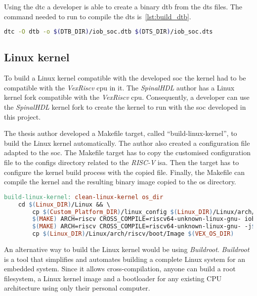 Using the \acrfull{dtc} a developer is able to create a binary \acrfull{dtb} from the \acrfull{dts} files. The command needed to run to compile the \acrshort{dts} is~\ref{lst:build_dtb}.

\begin{lstlisting}[language=bash, caption={Makefile target to build the device tree blob.}, label=lst:build_dtb]
dtc -O dtb -o $(DTB_DIR)/iob_soc.dtb $(DTS_DIR)/iob_soc.dts
\end{lstlisting}

\subsection{Linux kernel}
To build a Linux kernel compatible with the developed \acrshort{soc} the kernel had to be compatible with the \textit{VexRiscv} \acrshort{cpu} in it. The \textit{SpinalHDL} author has a Linux kernel fork compatible with the \textit{VexRiscv} \acrshort{cpu}. Consequently, a developer can use the \textit{SpinalHDL} kernel fork to create the kernel to run with the \acrshort{soc} developed in this project.

The thesis author developed a Makefile target, called \enquote{build-linux-kernel}, to build the Linux kernel automatically. The author also created a configuration file adapted to the \acrshort{soc}. The Makefile target has to copy the customised configuration file to the configs directory related to the \textit{RISC-V} \acrshort{isa}. Then the target has to configure the kernel build process with the copied file. Finally, the Makefile can compile the kernel and the resulting binary image copied to the \acrshort{os} directory.

\begin{lstlisting}[language=make, caption={Root file system Makefile target.}, label=lst:rootfs_makefile]
build-linux-kernel: clean-linux-kernel os_dir
    cd $(Linux_DIR)/Linux && \
        cp $(Custom_Platform_DIR)/linux_config $(Linux_DIR)/Linux/arch/riscv/configs/iob_soc_defconfig && \
        $(MAKE) ARCH=riscv CROSS_COMPILE=riscv64-unknown-linux-gnu- iob_soc_defconfig && \
        $(MAKE) ARCH=riscv CROSS_COMPILE=riscv64-unknown-linux-gnu- -j$(nproc) && \
        cp $(Linux_DIR)/Linux/arch/riscv/boot/Image $(VEX_OS_DIR)
\end{lstlisting}

An alternative way to build the Linux kernel would be using \textit{Buildroot}. \textit{Buildroot}~\cite{buildroot} is a tool that simplifies and automates building a complete Linux system for an embedded system. Since it allows cross-compilation, anyone can build a root filesystem, a Linux kernel image and a bootloader for any existing CPU architecture using only their personal computer.

